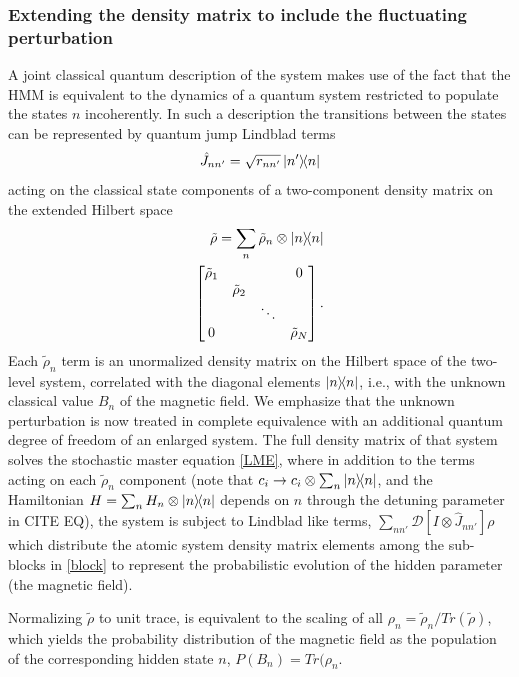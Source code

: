 \documentclass[aps,pra,twocolumn,groupedaddress,showpacs]{revtex4}
\begin{document}
\subsubsection{Extending the density matrix to include the fluctuating perturbation}

A joint classical quantum description of the system makes use of the fact that the HMM is equivalent to the dynamics of a quantum system restricted to populate the states $n$ incoherently. In such a description the transitions between the states can be represented by quantum jump Lindblad terms
\begin{equation}
\hat J_{nn'} = \sqrt{r_{nn'}} \dyad{n'}{n} \label{Linblad_B_Jump_Operator}
\end{equation}
acting on the classical state components of a two-component density matrix on the extended Hilbert space
\begin{eqnarray} \label{block}
\tilde{\rho} = \sum_n \tilde{\rho}_n \otimes \dyad{n}{n}\nonumber \\
\begin{bmatrix}
\tilde{\rho}_1 & & & 0\\
& \tilde{\rho}_2 & & \\
& & \ddots & \\
0 & & & \tilde{\rho}_N
	\end{bmatrix}.
\end{eqnarray}
Each $\tilde{\rho}_n$ term is an unormalized density matrix on the Hilbert space of the two-level system, correlated with the diagonal elements $\dyad{n}{n}$, i.e., with the unknown classical value $B_n$ of the magnetic field. We emphasize that the unknown perturbation is now treated in complete equivalence with an additional quantum degree of freedom of an enlarged system. The full density matrix of that system solves the stochastic master equation \eqref{LME}, where in addition to the terms acting on each $\tilde{\rho}_n$ component (note that $c_i \rightarrow c_i \otimes \sum_n \dyad{n}{n}$, and the Hamiltonian $H= \sum_n H_n\otimes \dyad{n}{n}$ depends on $n$ through the detuning parameter in CITE EQ), the system is subject to Lindblad like terms, $\sum_{nn'}\mathcal{D}[I\otimes\hat J_{nn'}]\rho$ which distribute the atomic system density matrix elements among the sub-blocks in \eqref{block} to represent the probabilistic evolution of the hidden parameter (the magnetic field).

Normalizing $\tilde{\rho}$ to unit trace, is equivalent to the scaling of all $\rho_{n}=\tilde{\rho}_n/Tr(\tilde{\rho})$, which yields the probability distribution of the magnetic field as the population of the corresponding hidden state $n$, $P(B_n)=Tr(\rho_n$. 
\end{document}

